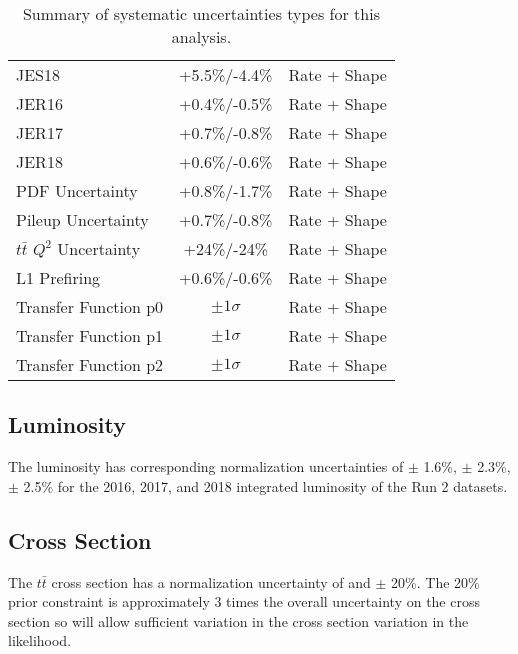 \begin{table}[!htbp]
\begin{center}
\begin{tabular}{lcc}
            JES18                     & +5.5\%/-4.4\% & Rate + Shape \\
            JER16                      & +0.4\%/-0.5\% & Rate + Shape \\
            JER17                      & +0.7\%/-0.8\% & Rate + Shape \\
            JER18                      & +0.6\%/-0.6\% & Rate + Shape \\
            PDF Uncertainty                               &  +0.8\%/-1.7\% & Rate + Shape \\
            Pileup Uncertainty                            & +0.7\%/-0.8\% & Rate + Shape \\
            $t\bar{t}$ $Q^2$ Uncertainty                  &+24\%/-24\% & Rate + Shape \\
            L1 Prefiring                                      & +0.6\%/-0.6\% & Rate + Shape \\
            Transfer Function p0                      & $\pm 1 \sigma$ & Rate + Shape \\
            Transfer Function p1                      & $\pm 1 \sigma$ & Rate + Shape \\
            Transfer Function p2                      & $\pm 1 \sigma$ & Rate + Shape \\
        \end{tabular}
        \caption{Summary of systematic uncertainties types for this analysis.} 
        \label{tab:syst_table}
    \end{center}
\end{table}


    



\subsection{Luminosity} 

The luminosity has corresponding normalization uncertainties of $\pm$ 1.6\%,  $\pm$ 2.3\%, $\pm$ 2.5\% for the 2016, 2017, and 2018 integrated luminosity of the Run 2 datasets. 

\subsection{Cross Section }

The $t\bar{t}$ cross section has a normalization uncertainty of and $\pm$ 20\%. The 20\% prior constraint is approximately 3 times the overall uncertainty on the cross section so will allow sufficient variation in the cross section variation in the likelihood. 


